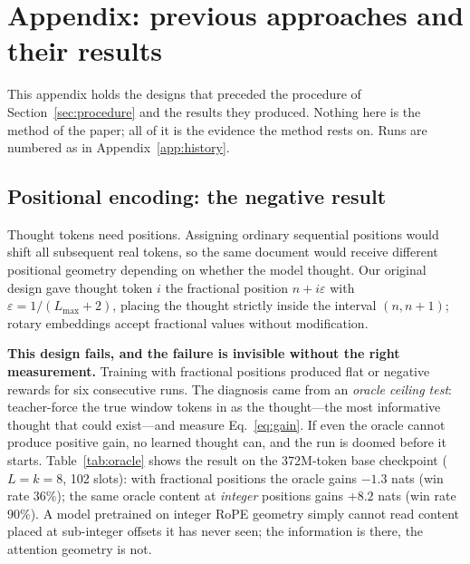 \documentclass{article} %
\begin{document}
\appendix

\section{Appendix: previous approaches and their results}
\label{app:previous}

This appendix holds the designs that preceded the procedure of Section~\ref{sec:procedure} and the results they produced. Nothing here is the method of the paper; all of it is the evidence the method rests on. Runs are numbered as in Appendix~\ref{app:history}.

\subsection{Positional encoding: the negative result}
\label{sec:positions}

Thought tokens need positions. Assigning ordinary sequential positions would shift all subsequent real tokens, so the same document would receive different positional geometry depending on whether the model thought. Our original design gave thought token $i$ the fractional position $n + i\varepsilon$ with $\varepsilon = 1/(L_{\max}+2)$, placing the thought strictly inside the interval $(n, n{+}1)$; rotary embeddings \citep{su2021roformer} accept fractional values without modification.

\textbf{This design fails, and the failure is invisible without the right measurement.} Training with fractional positions produced flat or negative rewards for six consecutive runs. The diagnosis came from an \emph{oracle ceiling test}: teacher-force the true window tokens in as the thought---the most informative thought that could exist---and measure Eq.~\eqref{eq:gain}. If even the oracle cannot produce positive gain, no learned thought can, and the run is doomed before it starts. Table~\ref{tab:oracle} shows the result on the 372M-token base checkpoint ($L{=}k{=}8$, 102 slots): with fractional positions the oracle gains $-1.3$ nats (win rate 36\%); the same oracle content at \emph{integer} positions gains $+8.2$ nats (win rate 90\%). A model pretrained on integer RoPE geometry simply cannot read content placed at sub-integer offsets it has never seen; the information is there, the attention geometry is not.
\end{document}
